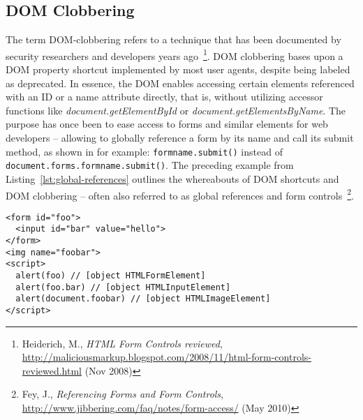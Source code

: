     \subsection{DOM Clobbering}
    \label{subsubsec:5.4.3.dom_clobbering}

    The term DOM-clobbering refers to a technique that has been documented by security researchers and developers years ago~\footnote{Heiderich, M., \textit{HTML Form Controls reviewed}, \url{http://maliciousmarkup.blogspot.com/2008/11/html-form-controls-reviewed.html} (Nov 2008)}. DOM clobbering bases upon a DOM property shortcut implemented by most user agents, despite being labeled as deprecated. In essence, the DOM enables accessing certain elements referenced with an ID or a name attribute directly, that is, without utilizing accessor functions like \textit{document.getElementById} or \textit{document.getElementsByName}. The purpose has once been to ease access to forms and similar elements for web developers -- allowing to globally reference a form by its name and call its submit method, as shown in for example: \texttt{formname.submit()} instead of \texttt{document.forms.formname.submit()}. The preceding example from Listing~\ref{lst:global-references} outlines the whereabouts of DOM shortcuts and DOM 
clobbering -- often also referred to as global references and form controls~\footnote{Fey, J., \textit{Referencing Forms and Form Controls}, \url{http://www.jibbering.com/faq/notes/form-access/} (May 2010)}.

\begin{lstlisting}[label=lst:global-references,caption=Example for global DOM references; HTML elements cause overwriting of native DOM properties,captionpos=b]
<form id="foo">
  <input id="bar" value="hello">
</form>
<img name="foobar">
<script>
  alert(foo) // [object HTMLFormElement]
  alert(foo.bar) // [object HTMLInputElement]
  alert(document.foobar) // [object HTMLImageElement]
</script>
\end{lstlisting}

